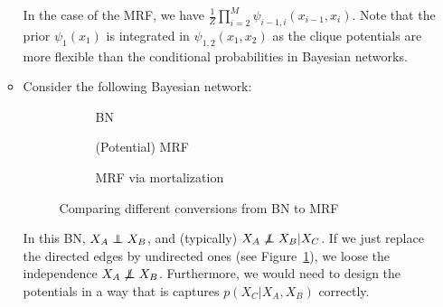 \begin{itemize}
\begin{itemize}
		In the case of the MRF, we have $\frac{1}{Z}\prod_{i=2}^{M}\psi_{i-1,i}(x_{i-1},x_i)$. Note that the prior $\psi_1(x_1)$ is integrated in $\psi_{1,2}(x_1,x_2)$ as the clique potentials are more flexible than the conditional probabilities in Bayesian networks.
		
		\item Consider the following Bayesian network:
		\begin{figure}[ht!]
			\centering
			\begin{subfigure}{0.25\textwidth}
				\centering
				\caption{BN}
			\end{subfigure}
			\hspace{5mm}
			\begin{subfigure}{0.25\textwidth}
				\centering
				\caption{(Potential) MRF}
				\label{fig:graphical_models_BN_to_MRF_2}
			\end{subfigure}
			\hspace{5mm}
			\begin{subfigure}{0.25\textwidth}
				\centering
				\caption{MRF via mortalization}
				\label{fig:graphical_models_BN_to_MRF_3}
			\end{subfigure}
			\caption{Comparing different conversions from BN to MRF}
		\end{figure}
	
		In this BN, $X_A\independent X_B$, and (typically) $X_A\not\independent X_B|X_C$. If we just replace the directed edges by undirected ones (see Figure~\ref{fig:graphical_models_BN_to_MRF_2}), we loose the independence $X_A\not\independent X_B$. Furthermore, we would need to design the potentials in a way that is captures $p(X_C|X_A,X_B)$ correctly.
		

\end{itemize}
\end{itemize}
